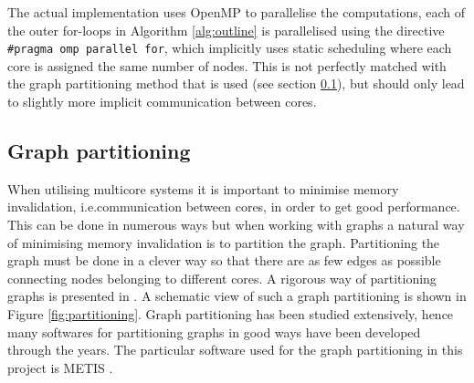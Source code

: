 The actual implementation uses OpenMP \cite{openmp} to parallelise the computations, each of the outer for-loops in Algorithm \ref{alg:outline} is parallelised using the directive \texttt{\#pragma omp parallel for}, which implicitly uses static scheduling where each core is assigned the same number of nodes. This is not perfectly matched with the graph partitioning method that is used (see section \ref{sec:graph_part}), but should only lead to slightly more implicit communication between cores.

\subsection{Graph partitioning}
\label{sec:graph_part}
When utilising multicore systems it is important to minimise memory invalidation, i.e.\@ communication between cores, in order to get good performance. This can be done in numerous ways but when working with graphs a natural way of minimising memory invalidation is to partition the graph. Partitioning the graph must be done in a clever way so that there are as few edges as possible connecting nodes belonging to different cores. A rigorous way of partitioning graphs is presented in . A schematic view of such a graph partitioning is shown in Figure \ref{fig:partitioning}. Graph partitioning has been studied extensively, hence many softwares for partitioning graphs in good ways have been developed through the years. The particular software used for the graph partitioning in this project is METIS \cite{Lasalle}. 

